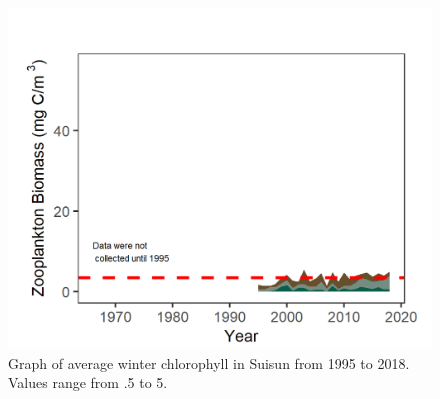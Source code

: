 \documentclass[
]{book}
\begin{document}
\begin{panel-grid}
\begin{columns-nocenter}
\begin{column800}
\begin{expand}
\end{expand}

\end{column800}

\begin{column40}

~

\end{column40}

\begin{column800}

\begin{expand}

\begin{figure}
\includegraphics[width=15.25in]{figures/zoops_sswinter} \caption{Graph of average winter chlorophyll in Suisun from 1995 to 2018. Values range from .5 to 5.}\label{fig:unnamed-chunk-166}
\end{figure}

\end{expand}

\end{column800}

\begin{column40}

~

\end{column40}

\begin{column800}

\begin{expand}


\end{expand}
\end{column800}
\end{columns-nocenter}
\end{panel-grid}
\end{document}
